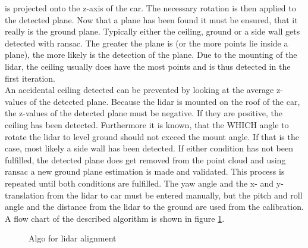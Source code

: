 is projected onto the z-axis of the car.
The necessary rotation is then applied to the detected plane.
Now that a plane has been found it must be ensured, that it really is the ground plane.
Typically either the ceiling, ground or a side wall gets detected with \acrshort{ransac}.
The greater the plane is (or the more points lie inside a plane), the more likely is the detection of the plane.
Due to the mounting of the lidar, the ceiling usually does have the most points and is thus detected in the first iteration.\\
An accidental ceiling detected can be prevented by looking at the average z-values of the detected plane.
Because the lidar is mounted on the roof of the car, the z-values of the detected plane must be negative.
If they are positive, the ceiling has been detected.
Furthermore it is known, that the WHICH angle to rotate the lidar to level ground should not exceed the mount angle.
If that is the case, most likely a side wall has been detected.
If either condition has not been fulfilled, the detected plane does get removed from the point cloud and using \acrshort{ransac} a new ground plane estimation is made and validated.
This process is repeated until both conditions are fulfilled.
The yaw angle and the x- and y-translation from the \acrshort{lidar} to car
must be entered manually, but the pitch and roll angle and the distance from the \acrshort{lidar} to the ground are used from the calibration.
A flow chart of the described algorithm is shown in figure \ref{fig:flowchart_lidar_calibration}.

\begin{figure}[htb]
    \centering
    
    \caption{Algo for \acrshort{lidar} alignment}
    \label{fig:flowchart_lidar_calibration}
\end{figure}


